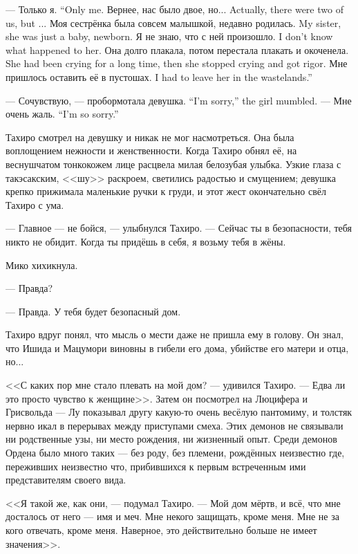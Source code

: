 {--- Только я.}
{``Only me.}
{Вернее, нас было двое, но...}
{Actually, there were two of us, but ...}
{Моя сестрёнка была совсем малышкой, недавно родилась.}
{My sister, she was just a baby, newborn.}
{Я не знаю, что с ней произошло.}
{I don't know what happened to her.}
{Она долго плакала, потом перестала плакать и окоченела.}
{She had been crying for a long time, then she stopped crying and got rigor.}
{Мне пришлось оставить её в пустошах.}
{I had to leave her in the wastelands.''}

{--- Сочувствую, --- пробормотала девушка.}
{``I'm sorry,'' the girl mumbled.}
{--- Мне очень жаль.}
{``I'm so sorry.''}

Тахиро смотрел на девушку и никак не мог насмотреться.
Она была воплощением нежности и женственности.
Когда Тахиро обнял её, на веснушчатом тонкокожем лице расцвела милая белозубая улыбка.
Узкие глаза с такэсакским, <<шу>> раскроем, светились радостью и смущением;
девушка крепко прижимала маленькие ручки к груди, и этот жест окончательно свёл Тахиро с ума.

--- Главное --- не бойся, --- улыбнулся Тахиро.
--- Сейчас ты в безопасности, тебя никто не обидит.
Когда ты придёшь в себя, я возьму тебя в жёны.

Мико хихикнула.

--- Правда?

--- Правда.
У тебя будет безопасный дом.

\textspace

Тахиро вдруг понял, что мысль о мести даже не пришла ему в голову.
Он знал, что Ишида и Мацумори виновны в гибели его дома, убийстве его матери и отца, но...

<<С каких пор мне стало плевать на мой дом? --- удивился Тахиро.
--- Едва ли это просто чувство к женщине>>.
Затем он посмотрел на Люцифера и Грисвольда --- Лу показывал другу какую-то очень весёлую пантомиму, и толстяк нервно икал в перерывах между приступами смеха.
Этих демонов не связывали ни родственные узы, ни место рождения, ни жизненный опыт.
Среди демонов Ордена было много таких --- без роду, без племени, рождённых неизвестно где, переживших неизвестно что, прибившихся к первым встреченным ими представителям своего вида.

<<Я такой же, как они, --- подумал Тахиро.
--- Мой дом мёртв, и всё, что мне досталось от него --- имя и меч.
Мне некого защищать, кроме меня.
Мне не за кого отвечать, кроме меня.
Наверное, это действительно больше не имеет значения>>.

